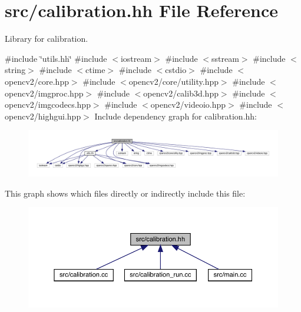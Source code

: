 \hypertarget{calibration_8hh}{}\section{src/calibration.hh File Reference}
\label{calibration_8hh}


Library for calibration.  


{\ttfamily \#include \char`\"{}utils.\+hh\char`\"{}}\newline
{\ttfamily \#include $<$iostream$>$}\newline
{\ttfamily \#include $<$sstream$>$}\newline
{\ttfamily \#include $<$string$>$}\newline
{\ttfamily \#include $<$ctime$>$}\newline
{\ttfamily \#include $<$cstdio$>$}\newline
{\ttfamily \#include $<$opencv2/core.\+hpp$>$}\newline
{\ttfamily \#include $<$opencv2/core/utility.\+hpp$>$}\newline
{\ttfamily \#include $<$opencv2/imgproc.\+hpp$>$}\newline
{\ttfamily \#include $<$opencv2/calib3d.\+hpp$>$}\newline
{\ttfamily \#include $<$opencv2/imgcodecs.\+hpp$>$}\newline
{\ttfamily \#include $<$opencv2/videoio.\+hpp$>$}\newline
{\ttfamily \#include $<$opencv2/highgui.\+hpp$>$}\newline
Include dependency graph for calibration.\+hh\+:
\nopagebreak
\begin{figure}[H]
\begin{center}
\leavevmode
\includegraphics[width=350pt]{calibration_8hh__incl}
\end{center}
\end{figure}
This graph shows which files directly or indirectly include this file\+:
\nopagebreak
\begin{figure}[H]
\begin{center}
\leavevmode
\includegraphics[width=350pt]{calibration_8hh__dep__incl}
\end{center}
\end{figure}
